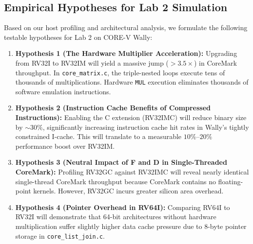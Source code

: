 \documentclass[11pt,a4paper]{article}
\begin{document}
\subsection{Empirical Hypotheses for Lab 2 Simulation}
Based on our host profiling and architectural analysis, we formulate the following testable hypotheses for Lab 2 on CORE-V Wally:
\begin{enumerate}[leftmargin=1.4em]
    \item \textbf{Hypothesis 1 (The Hardware Multiplier Acceleration):} Upgrading from RV32I to RV32IM will yield a massive jump ($>3.5\times$) in CoreMark throughput. In \texttt{core\_matrix.c}, the triple-nested loops execute tens of thousands of multiplications. Hardware \texttt{MUL} execution eliminates thousands of software emulation instructions.
    \item \textbf{Hypothesis 2 (Instruction Cache Benefits of Compressed Instructions):} Enabling the C extension (RV32IMC) will reduce binary size by ${\sim}30\%$, significantly increasing instruction cache hit rates in Wally's tightly constrained I-cache. This will translate to a measurable $10\%\text{--}20\%$ performance boost over RV32IM.
    \item \textbf{Hypothesis 3 (Neutral Impact of F and D in Single-Threaded CoreMark):} Profiling RV32GC against RV32IMC will reveal nearly identical single-thread CoreMark throughput because CoreMark contains no floating-point kernels. However, RV32GC incurs greater silicon area overhead.
    \item \textbf{Hypothesis 4 (Pointer Overhead in RV64I):} Comparing RV64I to RV32I will demonstrate that 64-bit architectures without hardware multiplication suffer slightly higher data cache pressure due to 8-byte pointer storage in \texttt{core\_list\_join.c}.
\end{enumerate}
\end{document}
